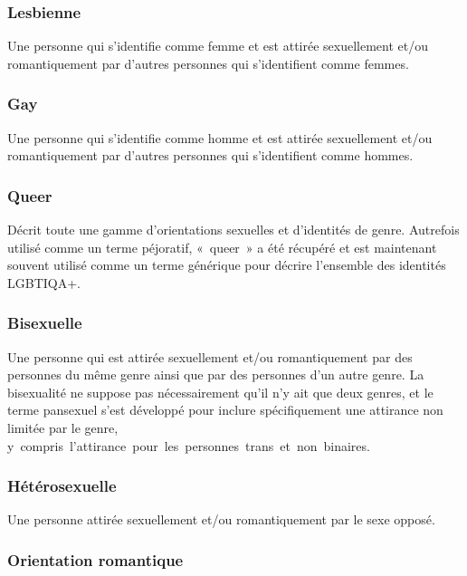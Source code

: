 \documentclass[12pt,openany]{book}
\begin{document}
\subsubsection*{Lesbienne}

\noindent Une personne qui s’identifie comme femme et est attirée sexuellement et/ou romantiquement par d’autres personnes qui s’identifient comme femmes.

\subsubsection*{Gay}

\noindent Une personne qui s’identifie comme homme et est attirée sexuellement et/ou romantiquement par d’autres personnes qui s’identifient comme hommes.

\subsubsection*{Queer}

\noindent Décrit toute une gamme d’orientations sexuelles et d’identités de genre. Autrefois utilisé comme un terme péjoratif, \mbox{« queer »} a été récupéré et est maintenant souvent utilisé comme un terme générique pour décrire l’ensemble des identités LGBTIQA+.

\subsubsection*{Bisexuelle}

\noindent Une personne qui est attirée sexuellement et/ou romantiquement par des personnes du même genre ainsi que par des personnes d’un autre genre. La bisexualité ne suppose pas nécessairement qu’il n’y ait que deux genres, et le terme pansexuel s’est développé pour inclure spécifiquement une attirance non limitée par le genre, \mbox{y compris l’attirance pour les personnes trans et non binaires}.

\subsubsection*{Hétérosexuelle}

\noindent Une personne attirée sexuellement et/ou romantiquement par le sexe opposé.

\subsubsection*{Orientation romantique}
\end{document}

